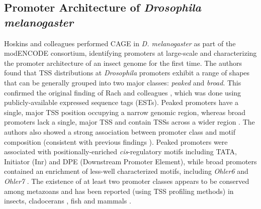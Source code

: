 \documentclass[runningheads,a4paper]{llncs}
\begin{document}
\begin{linenumbers}
\subsection{Promoter Architecture of \textit{Drosophila melanogaster}}
Hoskins and colleagues \cite{Hoskins:2011io} performed CAGE in \textit{D. melanogaster} as part of the modENCODE consortium, identifying promoters at large-scale and characterizing the promoter architecture of an insect genome for the first time.
The authors found that TSS distributions at \textit{Drosophila} promoters exhibit a range of shapes that can be generally grouped into two major classes: \textit{peaked} and \textit{broad}. 
This confirmed the original finding of Rach and colleagues \cite{Rach:2009ct}, which was done using publicly-available expressed sequence tags (ESTs).
Peaked promoters have a single, major TSS position occupying a narrow genomic region, whereas broad promoters lack a single, major TSS and contain TSSs across a wider region \cite{Rach:2009ct,Lenhard:2012en}. 
The authors also showed a strong association between promoter class and motif composition (consistent with previous findings \cite{Rach:2009ct,Ni:2010jh}). 
Peaked promoters were associated with positionally-enriched \textit{cis}-regulatory motifs including TATA, Initiator (Inr) and DPE (Downstream Promoter Element), while broad promoters contained an enrichment of less-well characterized motifs, including \textit{Ohler6} and \textit{Ohler7} \cite{Ohler:2002vl}. 
The existence of at least two promoter classes appears to be conserved among metazoans and has been reported (using TSS profiling methods) in insects, cladocerans \cite{Raborn:2016cr}, fish \cite{Nepal:2013bga} and mammals \cite{Carninci:2006in,Lenhard:2012en}.


\end{linenumbers}
\end{document}
